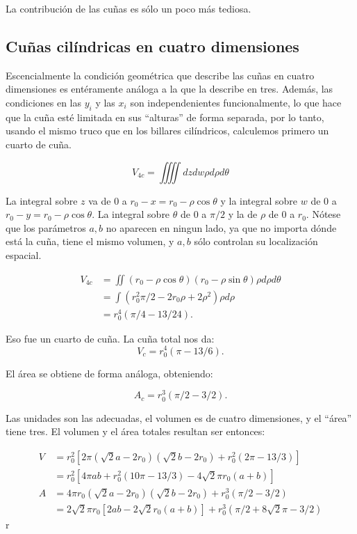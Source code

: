 \documentclass[letterpaperr,12pt]{article}
\begin{document}
La contribución de las cuñas es sólo un poco más tediosa.

\subsection{Cuñas cilíndricas en cuatro dimensiones}

Escencialmente la condición geométrica que describe
las cuñas en cuatro dimensiones es entéramente análoga
a la que la describe en tres. Además, las condiciones
en las $y_i$ y las $x_i$ son independenientes funcionalmente,
lo que hace que la cuña esté limitada en sus ``alturas'' 
de forma separada, por lo tanto, usando el mismo truco que en 
los billares cilíndricos, calculemos primero un cuarto de cuña.

\begin{equation}
V_{4c}=\iiiint dz dw \rho d \rho d \theta
\end{equation}

La integral sobre $z$ va de 0 a $r_0-x=r_0-\rho \cos \theta$ y 
la integral sobre $w$ de 0 a $r_0-y=r_0-\rho \cos \theta$.
La integral sobre $\theta$ de 0 a $\pi/2$ y 
la de $\rho$ de 0 a $r_0$.
Nótese que los parámetros $a,b$ no aparecen en ningun lado, 
ya que no importa dónde está la cuña, tiene el mismo volumen,
y $a,b $ sólo controlan su localización espacial. 

\begin{align}
V_{4c} & =\iint (r_0-\rho \cos \theta)(r_0 - \rho \sin \theta)
 \rho d \rho d \theta \\
&=\int (r_0^2 \pi/2 -2 r_0 \rho +2 \rho^2) \rho d \rho \\
&= r_0^4 (\pi/4-13/24).
\end{align}

Eso fue un cuarto de cuña. La cuña total nos da:
\begin{equation}
V_c= r_0^4 (\pi-13/6).
\end{equation}

El área se obtiene de forma análoga, obteniendo:

\begin{equation}
A_c= r_0^3 (\pi/2-3/2).
\end{equation}

Las unidades son las adecuadas, el volumen es de cuatro
dimensiones, y el ``área'' tiene tres.
El volumen y el área totales resultan ser entonces:

\begin{align}
 V & = r_0^2 [2 \pi  (\sqrt{2}a-2 r_0) (\sqrt{2}b-2 r_0) + r_0^2 (2\pi-13/3)] \\
 & = r_0^2 [4 \pi ab   + r_0^2 (10\pi-13/3)-4 \sqrt{2} \pi r_0 (a+b)] \\
A & = 4\pi r_0 (\sqrt{2}a-2 r_0) (\sqrt{2}b-2 r_0) +  r_0^3 (\pi/2-3/2) \\
 & = 2 \sqrt{2} \pi r_0 [2 ab -2\sqrt{2} r_0 (a+b)] +  r_0^3 (\pi/2+8\sqrt{2}\pi-3/2) 
\end{align}r
\end{document}
